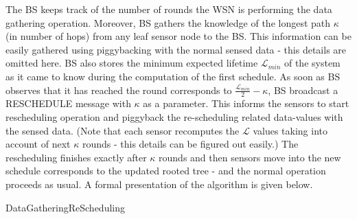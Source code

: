 \documentclass[10pt]{llncs}
\begin{document}
The BS keeps track of the number of rounds the WSN is performing the data gathering operation. Moreover, BS gathers the knowledge of the longest path $\kappa$ (in number of hops) from any leaf sensor node to the BS. This information can be easily gathered using piggybacking with the normal sensed data - this details are omitted here. BS also stores the minimum expected lifetime $\mathcal{L}_{min}$ of the system as it came to know during the computation of the first schedule. As soon as BS observes that it has reached the round corresponds to $\frac{\mathcal{L}_{min}}{2} - \kappa$, BS broadcast a RESCHEDULE message with $\kappa$ as a parameter. This informs the sensors to start rescheduling operation and piggyback the re-scheduling related data-values with the sensed data. (Note that each sensor recomputes the $\mathcal{L}$ values taking into account of next $\kappa$ rounds - this details can be figured out easily.) The rescheduling finishes exactly after $\kappa$ rounds and then sensors move into the new schedule corresponds to the updated rooted tree - and the normal operation proceeds as usual. A formal presentation of the algorithm is given below.

\begin{algorithm}[htb]
\begin{algorithmic}
		\ENDIF
	\ENDIF
	\ELSE {}
	\ENDIF
\ENDFOR
\STATE{}
\ENDIF
{}
\ENDIF
\end{algorithmic}
\caption{DataGatheringReScheduling} \label{algo:DataGatheringReScheduling}
\end{algorithm}
\end{document}
